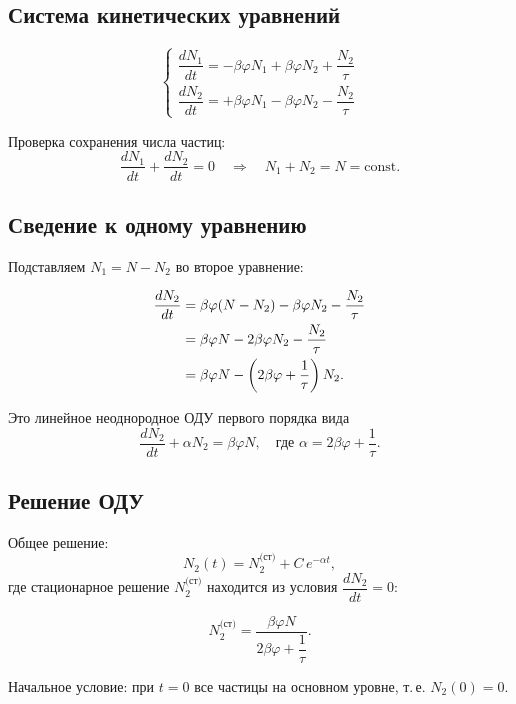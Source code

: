 \documentclass[12pt, a4paper]{article}
\begin{document}
\subsection*{Система кинетических уравнений}


\begin{equation}
    \begin{cases}
        \dfrac{dN_1}{dt} = -\beta\varphi N_1 + \beta\varphi N_2 + \dfrac{N_2}{\tau} \\[8pt]
        \dfrac{dN_2}{dt} = +\beta\varphi N_1 - \beta\varphi N_2 - \dfrac{N_2}{\tau}
    \end{cases}
\end{equation}

Проверка сохранения числа частиц:
\[
    \frac{dN_1}{dt} + \frac{dN_2}{dt} = 0 \quad \Longrightarrow \quad N_1 + N_2 = N = \text{const}.
\]

\subsection*{Сведение к одному уравнению}

Подставляем $N_1 = N - N_2$ во второе уравнение:

\begin{align}
    \frac{dN_2}{dt} &= \beta\varphi(N - N_2) - \beta\varphi N_2 - \frac{N_2}{\tau} \notag \\
    &= \beta\varphi N - 2\beta\varphi N_2 - \frac{N_2}{\tau} \notag \\
    &= \beta\varphi N - \left(2\beta\varphi + \frac{1}{\tau}\right)N_2. \label{eq:ode}
\end{align}

Это линейное неоднородное ОДУ первого порядка вида
\[
    \frac{dN_2}{dt} + \alpha N_2 = \beta\varphi N, \quad \text{где } \alpha = 2\beta\varphi + \frac{1}{\tau}.
\]

\subsection*{Решение ОДУ}

Общее решение:
\[
    N_2(t) = N_2^{\text{(ст)}} + C\,e^{-\alpha t},
\]
где стационарное решение $N_2^{\text{(ст)}}$ находится из условия $\dfrac{dN_2}{dt}=0$:

\[
    N_2^{\text{(ст)}} = \frac{\beta\varphi N}{2\beta\varphi + \dfrac{1}{\tau}}.
\]

Начальное условие: при $t = 0$ все частицы на основном уровне, т.\,е. $N_2(0) = 0$.
\end{document}
